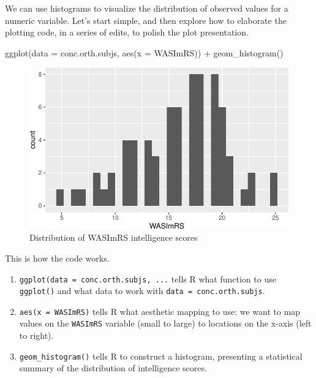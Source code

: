 \documentclass[
  letterpaper,
  DIV=11,
  numbers=noendperiod]{scrreprt}
\newenvironment{Shaded}{\begin{snugshade}}{\end{snugshade}}
\newcommand{\AttributeTok}[1]{\textcolor[rgb]{0.40,0.45,0.13}{#1}}
\newcommand{\FunctionTok}[1]{\textcolor[rgb]{0.28,0.35,0.67}{#1}}
\newcommand{\NormalTok}[1]{\textcolor[rgb]{0.00,0.23,0.31}{#1}}
\newcommand{\SpecialCharTok}[1]{\textcolor[rgb]{0.37,0.37,0.37}{#1}}
\providecommand{\tightlist}{%
  \setlength{\itemsep}{0pt}\setlength{\parskip}{0pt}}\usepackage{longtable,booktabs,array}
\begin{document}
We can use histograms to visualize the distribution of observed values
for a numeric variable. Let's start simple, and then explore how to
elaborate the plotting code, in a series of edits, to polish the plot
presentation.

\begin{Shaded}
\begin{Highlighting}[numbers=left,,]
\FunctionTok{ggplot}\NormalTok{(}\AttributeTok{data =}\NormalTok{ conc.orth.subjs, }\FunctionTok{aes}\NormalTok{(}\AttributeTok{x =}\NormalTok{ WASImRS)) }\SpecialCharTok{+}
  \FunctionTok{geom\_histogram}\NormalTok{()}
\end{Highlighting}
\end{Shaded}

\begin{figure}[H]

{\centering \includegraphics{visualization_files/figure-pdf/fig-hist-WASImRS-1.pdf}

}

\caption{\label{fig-hist-WASImRS}Distribution of WASImRS intelligence
scores}

\end{figure}

This is how the code works.

\begin{enumerate}
\def\labelenumi{\arabic{enumi}.}
\tightlist
\item
  \texttt{ggplot(data\ =\ conc.orth.subjs,\ ...} tells R what function
  to use \texttt{ggplot()} and what data to work with
  \texttt{data\ =\ conc.orth.subjs}.
\item
  \texttt{aes(x\ =\ WASImRS)} tells R what aesthetic mapping to use: we
  want to map values on the \texttt{WASImRS} variable (small to large)
  to locations on the x-axis (left to right).
\item
  \texttt{geom\_histogram()} tells R to construct a histogram,
  presenting a statistical summary of the distribution of intelligence
  scores.
\end{enumerate}
\end{document}
